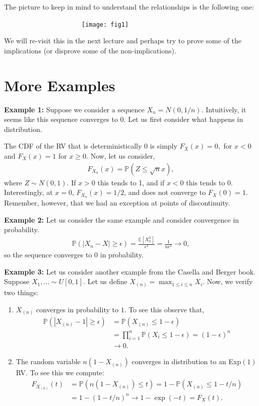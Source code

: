 \documentclass[twoside,12pt]{article}
\begin{document}
The picture to keep in mind to understand the relationships is the following one:

~~~~~~~~~~~~~~~~~~~~~~\texttt{[image: fig1]}

We will re-visit this in the next lecture and perhaps try to prove some of the implications (or disprove some of the non-implications).

\section{More Examples}

{\bf Example 1: } Suppose we consider a sequence $X_n = N(0,1/n).$ Intuitively, it seems like this sequence converges to $0$. Let us first consider what happens in distribution.

The CDF of the RV that is deterministically 0 is simply $F_X(x) = 0,$ for $x< 0$ and $F_X(x) = 1$ for $x \geq 0$. Now, let us consider,
\begin{align*}
F_{X_n}(x) = \mathbb{P}(Z \leq \sqrt{n} x),
\end{align*}
where $Z \sim N(0,1)$. If $x > 0$ this tends to 1, and if $x < 0$ this tends to 0. Interestingly, at $x = 0$, $F_{X_n}(x) = 1/2$, and does not converge to $F_X(0) = 1$. Remember, however, that we had an exception at points of discontinuity.

{\bf Example 2: } Let us consider the same example and consider convergence in probability. 
\begin{align*}
\mathbb{P}(|X_n - X| \geq \epsilon) = \frac{\mathbb{E}[X_n^2]}{\epsilon^2} = \frac{1}{n\epsilon^2} \rightarrow 0,
\end{align*}
so the sequence converges to 0 in probability.

{\bf Example 3: } Let us consider another example from the Casella and Berger book. Suppose $X_1,\ldots \sim U[0,1]$. Let us define $X_{(n)} = \max_{1 \leq i \leq n} X_i.$ Now, we verify two things:
\begin{enumerate}
\item $X_{(n)}$ converges in probability to $1$. To see this observe that,
\begin{align*}
\mathbb{P}(|X_{(n)} - 1| \geq \epsilon) &= \mathbb{P}(X_{(n)} \leq 1 - \epsilon) \\
&= \prod_{i=1}^n \mathbb{P}(X_i \leq 1 - \epsilon) = (1- \epsilon)^n \\
&\rightarrow 0.
\end{align*}
\item The random variable $n(1 - X_{(n)})$ converges in distribution to an Exp$(1)$ RV. To see this
we compute:
\begin{align*}
F_{X_{(n)}}(t) &= \mathbb{P}(n(1 - X_{(n)}) \leq t) = 1 - \mathbb{P}(X_{(n)} \leq 1 - t/n) \\
&= 1 - (1 - t/n)^n \rightarrow 1 - \exp(-t) = F_{X}(t).
\end{align*}
\end{enumerate}
\end{document}
